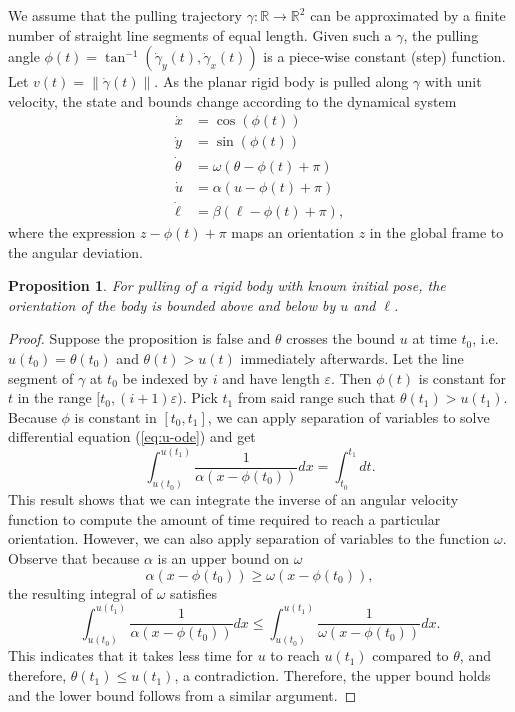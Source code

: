 \documentclass[conference]{IEEEtran}
\newtheorem{proposition}{Proposition}
\begin{document}
We assume that the pulling trajectory
$\gamma:\mathbb{R}\rightarrow\mathbb{R}^2$ can be approximated by a
finite number of straight line segments of equal length. Given such a
$\gamma$, the pulling angle
$\phi(t) = \tan^{-1}(\dot{\gamma}_y(t),\dot{\gamma}_x(t))$ is a
piece-wise constant (step) function. Let
$v(t) = \lVert\dot{\gamma}(t)\rVert$. As the planar rigid body is
pulled along $\gamma$ with unit velocity, the state and bounds change
according to the dynamical system
\begin{align}
  \dot{x} &= \cos(\phi(t))\\
  \dot{y} &= \sin(\phi(t))\\
  \dot{\theta} &= \omega(\theta - \phi(t) + \pi)\\
  \dot{u} &=  \alpha(u - \phi(t) + \pi) \label{eq:u-ode}\\ 
  \dot{\ell} &=  \beta(\ell - \phi(t) + \pi),
\end{align}
where the expression $z - \phi(t) + \pi$ maps an orientation $z$ in
the global frame to the angular deviation.

\begin{proposition}\label{prop:orientation-bounds}
  For pulling of a rigid body with known initial pose, the orientation
  of the body is bounded above and below by $u$ and $\ell$.
\end{proposition}

\begin{proof}
  Suppose the proposition is false and $\theta$ crosses the bound $u$
  at time $t_0$, i.e. $u(t_0)=\theta(t_0)$ and $\theta(t) > u(t)$
  immediately afterwards. Let the line segment of $\gamma$ at $t_0$ be
  indexed by $i$ and have length $\varepsilon$. Then $\phi(t)$ is
  constant for $t$ in the range $[t_0,(i+1)\varepsilon)$. Pick $t_1$
  from said range such that $\theta(t_1) > u(t_1)$. Because $\phi$ is
  constant in $[t_0,t_1]$, we can apply separation of variables to
  solve differential equation (\ref{eq:u-ode}) and get
  \begin{equation}
    \int_{u(t_0)}^{u(t_1)}\frac{1}{\alpha(x - \phi(t_0))}dx = \int_{t_0}^{t_1}dt.
  \end{equation}
  This result shows that we can integrate the inverse of an angular
  velocity function to compute the amount of time required to reach a
  particular orientation. However, we can also apply separation of
  variables to the function $\omega$. Observe that because $\alpha$ is
  an upper bound on $\omega$
  \begin{equation} 
    \alpha(x - \phi(t_0)) \geq \omega(x - \phi(t_0)),
  \end{equation}
  the resulting integral of $\omega$ satisfies
  \begin{equation}
    \int_{u(t_0)}^{u(t_1)}\frac{1}{\alpha(x - \phi(t_0))}dx \leq \int_{u(t_0)}^{u(t_1)}\frac{1}{\omega(x - \phi(t_0))}dx.
  \end{equation}
  This indicates that it takes less time for $u$ to reach $u(t_1)$
  compared to $\theta$, and therefore, $\theta(t_1) \leq u(t_1)$, a
  contradiction. Therefore, the upper bound holds and the lower bound
  follows from a similar argument.
\end{proof}
\end{document}
